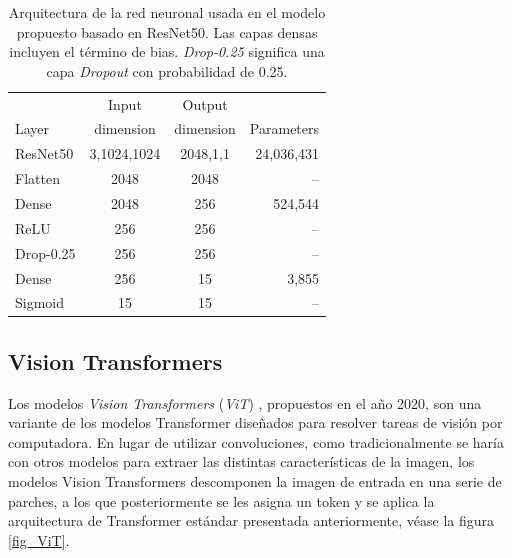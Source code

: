 \begin{table}[!ht]
    \centering
    \begin{tabular}{| l|c | c | r |}
    \hline
                 &     Input   &  Output    &  \\
    Layer        &   dimension & dimension  & Parameters \\
    \hline\hline
    ResNet50     &     3,1024,1024 &     2048,1,1 & 24,036,431 \\
    Flatten      &     2048        &     2048     &  --        \\
    Dense        &     2048        &     256      & 524,544    \\
    ReLU         &     256         &     256      & --         \\
    Drop-0.25  &     256         &     256      & --         \\
    Dense        &     256         &     15       &  3,855     \\
    Sigmoid      &     15          &     15       & --         \\
    \hline
    \end{tabular}
    \caption{Arquitectura de la red neuronal usada en el modelo propuesto basado en ResNet50. Las capas
    densas incluyen el término de bias. \textit{Drop-0.25} significa una capa \textit{Dropout} con
    probabilidad de 0.25.}
    \label{table_resnet50}
\end{table}

\subsection{Vision Transformers}

Los modelos \textit{Vision Transformers} (\textit{ViT}) \cite{DBLP:journals/corr/abs-2010-11929},
propuestos en el año 2020, son una variante de los modelos Transformer diseñados para resolver tareas
de visión por computadora. En lugar de utilizar convoluciones, como tradicionalmente se haría con
otros modelos para extraer las distintas características de la imagen, los modelos Vision Transformers
descomponen la imagen de entrada en una serie de parches, a los que posteriormente se les asigna un
token y se aplica la arquitectura de Transformer estándar presentada anteriormente, véase la figura
\ref{fig_ViT}.


